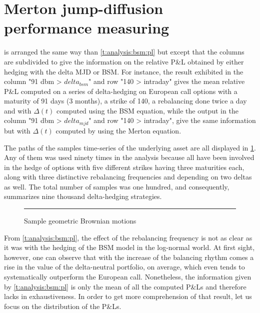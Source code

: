 \documentclass[12pt]{report}
\begin{document}
\section{Merton jump-diffusion performance measuring}
\label{sec:section name}

 is arranged the same way than \cref{t:analysis:bsm:pl} but except that the columns are subdivided to give the information on the relative P\&L obtained by either hedging with the delta MJD or BSM.
For instance, the result exhibited in the column "91 dbm > $delta_{bsm}$" and row "140 > intraday" gives the mean relative P\&L computed on a series of delta-hedging on European call options with a maturity of 91 days (3 months), a strike of 140, a rebalancing done twice a day and with $\Delta(t)$ computed using the BSM equation, while the output in the column "91 dbm > $delta_{mjd}$" and row "140 > intraday", give the same information but with $\Delta(t)$ computed by using the Merton equation.

The paths of the samples time-series of the underlying asset are all displayed in \cref{p:analysis:mjd:100}. 
Any of them was used ninety times in the analysis because all have been involved in the hedge of options with five different strikes having three maturities each, along with three distinctive rebalancing frequencies and depending on two deltas as well.
The total number of samples was one hundred, and consequently,  summarizes nine thousand delta-hedging strategies.

\begin{figure}[ht]
  \centering
  \rule{40mm}{20mm}
  \caption{Sample geometric Brownian motions}
  \label{p:analysis:mjd:100}
\end{figure}






From \cref{t:analysis:bsm:pl}, the effect of the rebalancing frequency is not as clear as it was with the hedging of the BSM model in the log-normal world.
At first sight, however, one can observe that with the increase of the balancing rhythm comes a rise in the value of the delta-neutral portfolio, on average, which even tends to systematically outperform the European call.
Nonetheless, the information given by \cref{t:analysis:bsm:pl} is only the mean of all the computed P\&Ls and therefore lacks in exhaustiveness.
In order to get more comprehension of that result, let us focus on the distribution of the P\&Ls.
\end{document}
